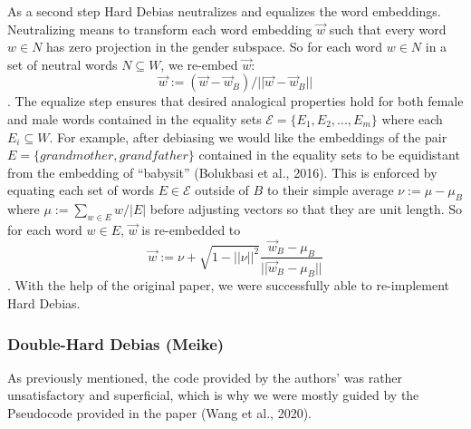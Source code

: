 \documentclass[
  english,
  man,floatsintext]{apa6}
\begin{document}
As a second step Hard Debias neutralizes and equalizes the word embeddings. Neutralizing means to transform each word embedding \(\vec{w}\) such that every word \(w\in N\) has zero projection in the gender subspace. So for each word \(w\in N\) in a set of neutral words \(N \subseteq W\), we re-embed \(\vec{w}\): \[\vec{w}:=(\vec{w}-\vec{w}_B)/||\vec{w}-\vec{w}_B||\]. The equalize step ensures that desired analogical properties hold for both female and male words contained in the equality sets \(\mathcal{E}=\{E_1,E_2,...,E_m\}\) where each \(E_i \subseteq W\). For example, after debiasing we would like the embeddings of the pair \(E=\{grandmother, grandfather\}\) contained in the equality sets to be equidistant from the embedding of \enquote{babysit} (Bolukbasi et al., 2016). This is enforced by equating each set of words \(E\in \mathcal{E}\) outside of \(B\) to their simple average \(\nu:=\mu-\mu_B\) where \(\mu:=\sum_{w\in E}w/|E|\) before adjusting vectors so that they are unit length. So for each word \(w\in E\), \(\vec{w}\) is re-embedded to \[\vec{w}:=\nu+\sqrt{1-||\nu||^2}\frac{\vec{w}_B-\mu_B}{||\vec{w}_B-\mu_B||}\].
With the help of the original paper, we were successfully able to re-implement Hard Debias.

\hypertarget{double-hard-debias-meike}{%
\subsubsection{Double-Hard Debias (Meike)}\label{double-hard-debias-meike}}

As previously mentioned, the code provided by the authors' was rather unsatisfactory and superficial, which is why we were mostly guided by the Pseudocode provided in the paper (Wang et al., 2020).
\end{document}

